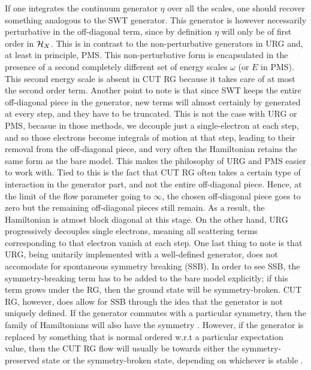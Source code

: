 \documentclass[12pt,twoside]{report}
\numberwithin{equation}{section}
\begin{document}
\pb If one integrates the continuum generator \(\eta\) over all the scales, one should recover something analogous to the SWT generator. This generator is however necessarily perturbative in the off-diagonal term, since by definition \(\eta\) will only be of first order in \(\mathcal{H}_X\). This is in contrast to the non-perturbative generators in URG and, at least in principle, PMS. This non-perturbative form is encapsulated in the presence of a second completely different set of energy scales \(\omega\) (or \(E\) in PMS). This second energy scale is absent in CUT RG because it takes care of at most the second order term.
\pb Another point to note is that since SWT keeps the entire off-diagonal piece in the generator, new terms will almost certainly by generated at every step, and they have to be truncated. This is not the case with URG or PMS, becasue in those methods, we decouple just a single-electron at each step, and so those electrons become integrals of motion at that step, leading to their removal from the off-diagonal piece, and very often the Hamiltonian retains the same form as the bare model. This makes the philosophy of URG and PMS easier to work with. Tied to this is the fact that CUT RG often takes a certain type of interaction in the generator part, and not the entire off-diagonal piece. Hence, at the limit of the flow parameter going to \(\infty\), the chosen off-diagonal piece goes to zero but the remaining off-diagonal pieces still remain. As a result, the Hamiltonian is atmost block diagonal at this stage. On the other hand, URG progressively decouples single electrons, meaning all scattering terms corresponding to that electron vanish at each step. 
\pb One last thing to note is that URG, being unitarily implemented with a well-defined generator, does not accomodate for spontaneous symmetry breaking (SSB). In order to see SSB, the symmetry-breaking term has to be added to the bare model explicitly; if this term grows under the RG, then the ground state will be symmetry-broken. CUT RG, however, does allow for SSB through the idea that the generator is not uniquely defined. If the generator commutes with a particular symmetry, then the family of Hamiltonians will also have the symmetry \cite{kehrein}. However, if the generator is replaced by something that is normal ordered w.r.t a particular expectation value, then the CUT RG flow will usually be towards either the symmetry-preserved state or the symmetry-broken state, depending on whichever is stable \cite{wegner_normal}.
\end{document}
